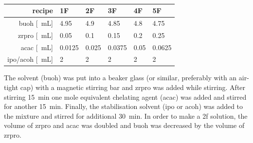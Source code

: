 \documentclass[a4paper]{article}
\newcommand{\td}[1]{\textbf{\textcolor{red}{#1}}}
\newcommand{\ds}[1]{}
\newcommand{\ml}[1]{\SI{#1}{\milli\liter}}
\newcommand{\minutes}[1]{\SI{#1}{\minute}}
\begin{document}
\begin{table}[h]
	\centering
	\caption{}
	\label{tab:rec2}
	\begin{tabular}{rlllll}
		\hline
		recipe	&1F		&2F		&3F		&4F		&5F		\\
		\hline
		\gls{buoh} [\ml{}]		&4.95	&4.9	&4.85	&4.8	&4.75	\\
		\gls{zrpro} [\ml{}]	&0.05	&0.1	&0.15	&0.2	&0.25	\\
		\gls{acac} [\ml{}]		&0.0125	&0.025	&0.0375	&0.05	&0.0625	\\
		\gls{ipo}/\gls{acoh} [\ml{}]		&2		&2		&2		&2		&2		\\
		\hline
	\end{tabular}
\end{table}

The solvent (\gls{buoh}) was put into a beaker glass (or similar, preferably with an 
air-tight cap) with a magnetic stirring bar and \gls{zrpro} was added while stirring. After 
stirring \minutes{\ds{10 to }15} one mole equivalent chelating agent (\gls{acac}) was 
added and stirred for another \minutes{\ds{10 to }15}. Finally, the stabilisation 
solvent\cite{Hu2016} (\gls{ipo} or \gls{acoh}) was added to the mixture and stirred for 
additional \minutes{\ds{20-}30}. 
In order to make a \gls{2f} solution, the volume of \gls{zrpro} and \gls{acac} was 
doubled and \gls{buoh} was decreased by the volume of \gls{zrpro}. 
\end{document}
